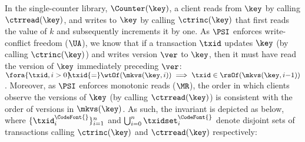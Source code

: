In the single-counter library, $\Counter(\key)$, 
a client reads from $\key$ by calling $\ctrread(\key)$, and writes to $\key$ by calling $\ctrinc(\key)$ 
that first reads the value of $k$ and subsequently increments it by one.
As $\PSI$ enforces write-conflict freedom (\(\UA\)),
we know that if a transaction $\txid$ updates $\key$ (by calling $\ctrinc(\key)$) and writes version $\ver$ to $\key$, 
then it must have read the version of $\key$ immediately preceding $\ver$:
$\fora{\txid, i > 0}\!\! \txid {=} \wtOf(\mkvs(\key, i)) \implies \txid \in \rsOf(\mkvs(\key, i{-}1))$. 
Moreover, as $\PSI$ enforces monotonic reads ($\MR$),
the order in which clients observe the versions of $\key$ (by calling $\ctrread(\key)$)
is consistent with the order of versions in $\mkvs(\key)$. 
As such, the invariant is depicted as below, where  
$\{\txid^{\CodeFont{}}_{i}\}_{i=1}^{n}$ and $\bigcup_{i=0}^{n} \txidset^{\CodeFont{}}_{i}$ 
denote disjoint sets of transactions calling $\ctrinc(\key)$ and $\ctrread(\key)$ respectively:\\[3pt]
%
\noindent
\ 
